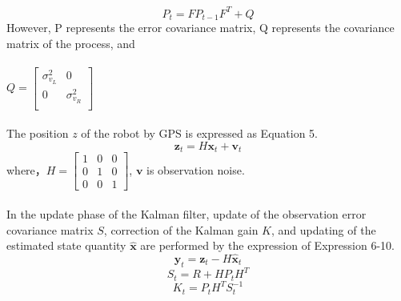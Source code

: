 \documentclass[a4paper]{article}
\begin{document}
\begin{equation}
    P_{t} = F P_{t-1} F^{T} + Q
    \label{eq:4}
\end{equation}
However, P represents the error covariance matrix, Q represents the covariance matrix of the process, and \\ \\$Q = \begin{bmatrix} \sigma_{v_{L}}^{2} & 0 \\  0 & \sigma_{v_{R}}^{2} \\  \end{bmatrix}$\\ \\
The position $z$ of the robot by GPS is expressed as Equation 5.
\begin{equation}
    \bm{z}_{t} = H\bm{x}_{t} + \bm{v}_{t}
    \label{eq:5}
\end{equation}
where，$H = \begin{bmatrix} 1 & 0 & 0 \\  0 & 1 & 0 \\  0 & 0 & 1 \end{bmatrix}$, 
$\bm{v}$ is observation noise. \\ \\
In the update phase of the Kalman filter, update of the observation error covariance matrix $S$, correction of the Kalman gain $K$, and updating of the estimated state quantity $\bm{\hat{x}}$ are performed by the expression of Expression 6-10.
\begin{equation}
    \bm{y}_{t} = \bm{z}_{t} - H\bm{\hat{x}}_{t}
    \label{eq:6}
\end{equation}
%
%
\begin{equation}
    S_{t} = R + HP_{t}H^{T}
    \label{eq:7}
\end{equation}
%
%
\begin{equation}
K_{t} = P_{t}H^{T}S_{t}^{-1}
    \label{eq:8}
\end{equation}
\end{document}

